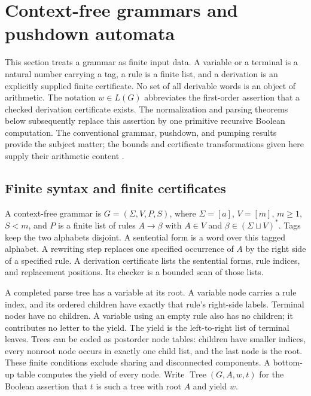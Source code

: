 \section{Context-free grammars and pushdown automata}
\label{sec:context-free}

This section treats a grammar as finite input data.  A variable or a terminal
is a natural number carrying a tag, a rule is a finite list, and a derivation
is an explicitly supplied finite certificate.  No set of all derivable words
is an object of arithmetic.  The notation $w\in L(G)$ abbreviates the
first-order assertion that a checked derivation certificate exists.  The
normalization and parsing theorems below subsequently replace this assertion
by one primitive recursive Boolean computation.  The conventional grammar,
pushdown, and pumping results provide the subject matter; the bounds and
certificate transformations given here supply their arithmetic content
\cite{Sipser2020}.

\subsection{Finite syntax and finite certificates}

\begin{definition}
\label{cf:definition}
A context-free grammar is $G=(\Sigma,V,P,S)$, where
$\Sigma=[a]$, $V=[m]$, $m\geq1$, $S<m$, and $P$ is a finite list of
rules $A\to\beta$ with $A\in V$ and
$\beta\in(\Sigma\sqcup V)^*$.  Tags keep the two alphabets disjoint.
A sentential form is a word over this tagged alphabet.  A rewriting step
replaces one specified occurrence of $A$ by the right side of a specified
rule.  A derivation certificate lists the sentential forms, rule indices,
and replacement positions.  Its checker is a bounded scan of those lists.

A completed parse tree has a variable at its root.  A variable node carries
a rule index, and its ordered children have exactly that rule's right-side
labels.  Terminal nodes have no children.  A variable using an empty rule
also has no children; it contributes no letter to the yield.  The yield is
the left-to-right list of terminal leaves.  Trees can be coded as postorder
node tables: children have smaller indices, every nonroot node occurs in
exactly one child list, and the last node is the root.  These finite conditions
exclude sharing and disconnected components.  A bottom-up table computes
the yield of every node.  Write $\operatorname{Tree}(G,A,w,t)$ for the
Boolean assertion that $t$ is such a tree with root $A$ and yield $w$.
\end{definition}

